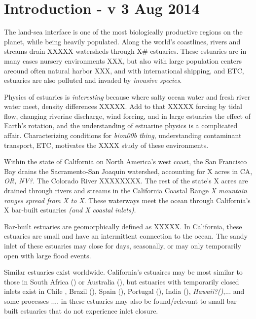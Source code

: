 \chapter{Introduction - v 3 Aug 2014}
\label{chIntro}











The land-sea interface is one of the most biologically productive regions on the planet, while being heavily populated. Along the world's coastlines, rivers and streams drain XXXXX watersheds through X\# estuaries.  These estuaries are in many cases nursery environments XXX, but also with large population centers areound often natural harbor XXX, and with international shipping, and ETC, estuaries are also polluted and invaded by \emph{invasive species}. 

Physics of estuaries is \emph{interesting} because where salty ocean water and fresh river water meet, density differences XXXXX. Add to that XXXXX forcing by tidal flow, changing riverine discharge, wind forcing, and in large estuaries the effect of Earth's rotation, and the understanding of estuarine physics is a complicated affair. Characterizing conditions for \emph{bion00b thing}, understanding contaminant transport, ETC, motivates the XXXX study of these environments. 

Within the state of California on North America's west coast, the San Francisco Bay drains the Sacramento-San Joaquin watershed, accounting for X acres in CA, \emph{OR, NV?}. The Colorado River XXXXXXXX. The rest of the state's X acres are drained through rivers and streams in the California Coastal Range \emph{X mountain ranges spread from X to X}. These waterways meet the ocean through California's X bar-built estuaries \emph{(and X coastal inlets).}

Bar-built estuaries are geomorphically defined as XXXXX. In California, these estuaries are small and have an intermittent connection to the ocean. The sandy inlet of these estuaries may close for days, seasonally, or may only temporarily open with large flood events. 

Similar estuaries exist worldwide. California's estuaires may be most similar to those in South Africa () or Australia (), but estuaries with temporarily closed inlets exist in Chile \parencite{dussaillant_water_2009}, Brazil (), Spain (), Portugal (), India (), \emph{Hawaii?()},... and some processes .... in these estuaries may also be found/relevant to small bar-built estuaries that do not experience inlet closure. 


